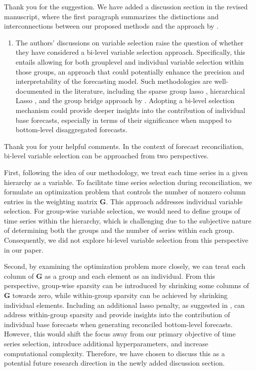 \documentclass[11pt,a4paper,]{article}
\providecommand{\tightlist}{%
  \setlength{\itemsep}{0pt}\setlength{\parskip}{0pt}}
\renewenvironment{quote}
               {\list{}{\rightmargin\leftmargin}%
                \item\relax\color[RGB]{0,150,0}}
               {\endlist}
\begin{document}
\begin{quote}
Thank you for the suggestion. We have added a discussion section in the
revised manuscript, where the first paragraph summarizes the
distinctions and interconnections between our proposed methods and the
approach by \textcite{Zhang2023-op}.
\end{quote}

\begin{enumerate}
\def\labelenumi{\arabic{enumi}.}
\setcounter{enumi}{1}
\tightlist
\item
  The authors' discussions on variable selection raise the question of
  whether they have considered a bi-level variable selection approach.
  Specifically, this entails allowing for both grouplevel and individual
  variable selection within those groups, an approach that could
  potentially enhance the precision and interpretability of the
  forecasting model. Such methodologies are well-documented in the
  literature, including the sparse group lasso \autocite{Simon2013-sp},
  hierarchical Lasso \autocite{Zhou2010-vs}, and the group bridge
  approach by \textcite{Huang2009-vs}. Adopting a bi-level selection
  mechanism could provide deeper insights into the contribution of
  individual base forecasts, especially in terms of their significance
  when mapped to bottom-level disaggregated forecasts.
\end{enumerate}

\begin{quote}
Thank you for your helpful comments. In the context of forecast
reconciliation, bi-level variable selection can be approached from two
perspectives.

First, following the idea of our methodology, we treat each time series
in a given hierarchy as a variable. To facilitate time series selection
during reconciliation, we formulate an optimization problem that
controls the number of nonzero column entries in the weighting matrix
\(\bm{G}\). This approach addresses individual variable selection. For
group-wise variable selection, we would need to define groups of time
series within the hierarchy, which is challenging due to the subjective
nature of determining both the groups and the number of series within
each group. Consequently, we did not explore bi-level variable selection
from this perspective in our paper.

Second, by examining the optimization problem more closely, we can treat
each column of \(\bm{G}\) as a group and each element as an individual.
From this perspective, group-wise sparsity can be introduced by
shrinking some columns of \(\bm{G}\) towards zero, while within-group
sparsity can be achieved by shrinking individual elements. Including an
additional lasso penalty, as suggested in \textcite{Simon2013-sp}, can
address within-group sparsity and provide insights into the contribution
of individual base forecasts when generating reconciled bottom-level
forecasts. However, this would shift the focus away from our primary
objective of time series selection, introduce additional
hyperparameters, and increase computational complexity. Therefore, we
have chosen to discuss this as a potential future research direction in
the newly added discussion section.
\end{quote}
\end{document}

